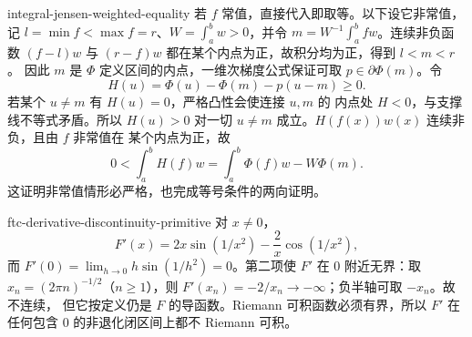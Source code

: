 \begin{solution}{integral-jensen-weighted-equality}
若 \(f\) 常值，直接代入即取等。以下设它非常值，记
\(l=\min f<\max f=r\)、\(W=\int_a^b w>0\)，并令
\(m=W^{-1}\int_a^b fw\)。连续非负函数 \((f-l)w\) 与
\((r-f)w\) 都在某个内点为正，故积分均为正，得到 \(l<m<r\)。
因此 \(m\) 是 \(\Phi\) 定义区间的内点，一维次梯度公式保证可取
\(p\in\partial\Phi(m)\)。令
\[
 H(u)=\Phi(u)-\Phi(m)-p(u-m)\ge0.
\]
若某个 \(u\ne m\) 有 \(H(u)=0\)，严格凸性会使连接 \(u,m\) 的
内点处 \(H<0\)，与支撑线不等式矛盾。所以 \(H(u)>0\) 对一切
\(u\ne m\) 成立。\(H(f(x))w(x)\) 连续非负，且由 \(f\) 非常值在
某个内点为正，故
\[
 0<\int_a^b H(f)w=\int_a^b\Phi(f)w-W\Phi(m).
\]
这证明非常值情形必严格，也完成等号条件的两向证明。
\end{solution}

\begin{solution}{ftc-derivative-discontinuity-primitive}
对 \(x\ne0\)，
\[
 F'(x)=2x\sin(1/x^2)-\frac2x\cos(1/x^2),
\]
而 \(F'(0)=\lim_{h\to0}h\sin(1/h^2)=0\)。第二项使 \(F'\) 在
\(0\) 附近无界：取 \(x_n=(2\pi n)^{-1/2}\)（\(n\ge1\)），则
\(F'(x_n)=-2/x_n\to-\infty\)；负半轴可取 \(-x_n\)。故不连续，
但它按定义仍是 \(F\) 的导函数。Riemann 可积函数必须有界，所以
\(F'\) 在任何包含 \(0\) 的非退化闭区间上都不
Riemann 可积。
\end{solution}
